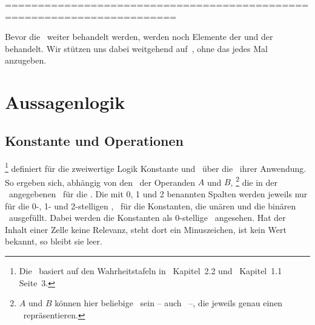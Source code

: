 ========================================================================

Bevor die \Schlussregel\ weiter behandelt werden, werden noch Elemente der \emph{\Aussagenlogik} und der \emph{\Praedikatenlogik} behandelt.
Wir stützen uns dabei weitgehend auf~\cite{bib:Rautenberg}, ohne das jedes Mal anzugeben.

\section{Aussagenlogik}%
\label{sec:Aussagenlogik}

\subsection{Konstante und Operationen}%
\label{sub:Operationen}

%
\footnote{%
	Die \tablename\ basiert auf den Wahrheitstafeln in~\cite{bib:Junktor} Kapitel~2.2 und~\cite{bib:Rautenberg} Kapitel~1.1 Seite~3.
}
definiert für die zweiwertige Logik Konstante und \Junktoren\ über die \Wahrheitswerte\ ihrer Anwendung.
So ergeben sich, abhängig von den \Wahrheitswerten\ der Operanden $A$ und $B$,%
\footnote{%
	$A$ und $B$ können hier beliebige \Aussagen\ sein -- auch \Formeln\ --, die jeweils genau einen \Wahrheitswert\ repräsentieren.
}
die in der \tablename\ angegebenen \Wahrheitswerte\ für die \Operationen.
Die mit 0, 1 und 2 benannten Spalten werden jeweils nur für die 0-, 1- und 2-stelligen \Junktoren, \textdh\ für die Konstanten, die unären und die binären \Junktoren\ ausgefüllt.
Dabei werden die Konstanten als 0-stellige \Junktoren\ angesehen.
Hat der Inhalt einer Zelle keine Relevanz, steht dort ein Minuszeichen, ist kein Wert bekannt, so bleibt sie leer.


